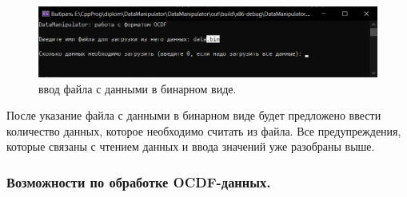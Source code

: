 {  \begin{figure}[H]
    \centering
    \includegraphics[width=\textwidth]{images/readOCDFbin.png}
    \caption{ввод файла с данными в бинарном виде.} 
    \label{fig:readOCDFbin}
  \end{figure}

  \par После указание файла с данными в бинарном виде будет предложено ввести количество данных, которое необходимо считать из файла. Все предупреждения, которые связаны с чтением данных и ввода значений уже разобраны выше. 

  \par
}

\subsubsection{ \standartTitleFont
  Возможности по обработке OCDF-данных. 
} 

